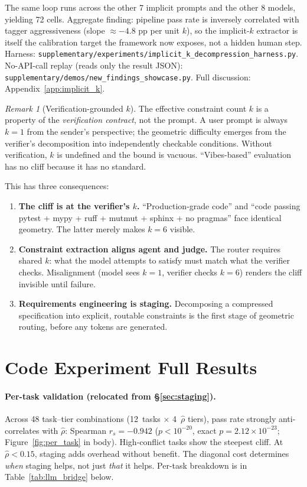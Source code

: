 \documentclass{article}
\theoremstyle{plain}
\theoremstyle{definition}
\theoremstyle{remark}
\newtheorem{remark}[theorem]{Remark}
\newcommand{\rhohat}{\hat{\rho}}
\begin{document}
\noindent The same loop runs across the other 7 implicit prompts and the other 8 models, yielding 72 cells. Aggregate finding: pipeline pass rate is inversely correlated with tagger aggressiveness (slope $\approx -4.8$ pp per unit $k$), so the implicit-$k$ extractor is itself the calibration target the framework now exposes, not a hidden human step. Harness: \texttt{supplementary/experiments/implicit\_k\_decompression\_harness.py}. No-API-call replay (reads only the result JSON): \texttt{supplementary/demos/new\_findings\_showcase.py}. Full discussion: Appendix~\ref{app:implicit_k}.

\begin{remark}[Verification-grounded $k$]\label{rem:verification_k}
The effective constraint count $k$ is a property of the \emph{verification contract}, not the prompt. A user prompt is always $k{=}1$ from the sender's perspective; the geometric difficulty emerges from the verifier's decomposition into independently checkable conditions. Without verification, $k$ is undefined and the bound is vacuous. ``Vibes-based'' evaluation has no cliff because it has no standard.

This has three consequences:
\begin{enumerate}[nosep]
\item \textbf{The cliff is at the verifier's $k$.} ``Production-grade code'' and ``code passing pytest + mypy + ruff + mutmut + sphinx + no pragmas'' face identical geometry. The latter merely makes $k{=}6$ visible.
\item \textbf{Constraint extraction aligns agent and judge.} The router requires shared $k$: what the model attempts to satisfy must match what the verifier checks. Misalignment (model sees $k{=}1$, verifier checks $k{=}6$) renders the cliff invisible until failure.
\item \textbf{Requirements engineering is staging.} Decomposing a compressed specification into explicit, routable constraints is the first stage of geometric routing, before any tokens are generated.
\end{enumerate}
\end{remark}

\section{Code Experiment Full Results}\label{app:code_full}

\paragraph{Per-task validation (relocated from \S\ref{sec:staging}).}
Across 48 task--tier combinations (12~tasks $\times$ 4~$\rhohat$ tiers), pass rate strongly anti-correlates with $\rhohat$: Spearman $r_s = -0.942$ ($p < 10^{-20}$, exact $p = 2.12 \times 10^{-23}$; Figure~\ref{fig:per_task} in body). High-conflict tasks show the steepest cliff. At $\rhohat < 0.15$, staging adds overhead without benefit. The diagonal cost determines \emph{when} staging helps, not just \emph{that} it helps. Per-task breakdown is in Table~\ref{tab:llm_bridge} below.
\end{document}
